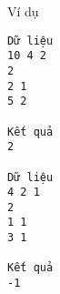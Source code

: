 Ví dụ
\begin{verbatim}
Dữ liệu
10 4 2
2
2 1
5 2	

Kết quả
2

Dữ liệu
4 2 1
2
1 1
3 1	

Kết quả
-1
\end{verbatim}
